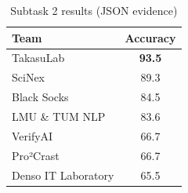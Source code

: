 \begin{table}[ht]
\centering
\small
\caption{Subtask 2 results (JSON evidence)}
\label{tab:subtask2_json}
\begin{tabular}{lc}
\toprule
Team & Accuracy \\
\midrule
TakasuLab & \textbf{93.5} \\
SciNex & 89.3 \\
Black Socks & 84.5 \\
LMU \& TUM NLP & 83.6 \\
VerifyAI & 66.7 \\
Pro²Crast & 66.7 \\
Denso IT Laboratory & 65.5 \\
\bottomrule
\end{tabular}
\end{table}
